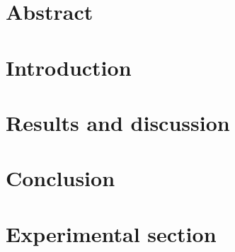 \documentclass[12pt,a4paper]{article}
\begin{document}
\newpage

\section*{Abstract}
\lipsum[1-1]

\newpage

\tableofcontents

\newpage


\section{Introduction}

\section{Results and discussion}

\section{Conclusion}

\section{Experimental section}

\newpage

\listoffigures
\listofschemes{}
\listoftables

\newpage

\printbibliography[heading=bibintoc, title={References}]
\end{document}
